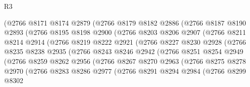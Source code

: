 \begin{lexlean}{R3}
\begin{coremodule}
                (@2766
                  @8171
                  @8174
                  @2879
                  (@2766
                    @8179
                    @8182
                    @2886
                    (@2766
                      @8187
                      @8190
                      @2893
                      (@2766
                        @8195
                        @8198
                        @2900
                        (@2766
                          @8203
                          @8206
                          @2907
                          (@2766
                            @8211
                            @8214
                            @2914
                            (@2766
                              @8219
                              @8222
                              @2921
                              (@2766
                                @8227
                                @8230
                                @2928
                                (@2766
                                  @8235
                                  @8238
                                  @2935
                                  (@2766
                                    @8243
                                    @8246
                                    @2942
                                    (@2766
                                      @8251
                                      @8254
                                      @2949
                                      (@2766
                                        @8259
                                        @8262
                                        @2956
                                        (@2766
                                          @8267
                                          @8270
                                          @2963
                                          (@2766
                                            @8275
                                            @8278
                                            @2970
                                            (@2766
                                              @8283
                                              @8286
                                              @2977
                                              (@2766
                                                @8291
                                                @8294
                                                @2984
                                                (@2766
                                                  @8299
                                                  @8302

\end{coremodule}
\end{lexlean}
